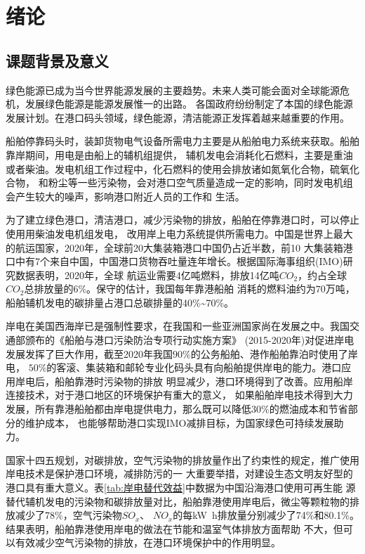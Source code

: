\chapter{绪论}

\section{课题背景及意义}
绿色能源已成为当今世界能源发展的主要趋势。未来人类可能会面对全球能源危机，发展绿色能源是能源发展惟一的出路。
各国政府纷纷制定了本国的绿色能源发展计划。在港口码头领域，绿色能源，清洁能源正发挥着越来越重要的作用。

船舶停靠码头时，装卸货物电气设备所需电力主要是从船舶电力系统来获取。船舶靠岸期间，用电是由船上的辅机组提供，
辅机发电会消耗化石燃料，主要是重油或者柴油。发电机组工作过程中，化石燃料的使用会排放诸如氮氧化合物，硫氧化合物，
和粉尘等一些污染物，会对港口空气质量造成一定的影响，同时发电机组会产生较大的噪声，影响港口附近人员的工作和
生活。

为了建立绿色港口，清洁港口，减少污染物的排放，船舶在停靠港口时，可以停止使用用柴油发电机组发电，
改用岸上电力系统提供所需电力。中国是世界上最大的航运国家，2020年，全球前20大集装箱港口中国仍占近半数，前10
大集装箱港口中有7个来自中国，中国港口货物吞吐量连年增长。根据国际海事组织(IMO)研究数据表明，2020年，全球
航运业需要4亿吨燃料，排放14亿吨$CO_{2}$，约占全球$CO_{2}$总排放量的$6\%$。保守的估计，我国每年靠港船舶
消耗的燃料油约为$70$万吨，船舶辅机发电的碳排量占港口总碳排量的40\%\~{}70\%\cite{SP1}。

岸电在美国西海岸已是强制性要求，在我国和一些亚洲国家尚在发展之中。我国交通部颁布的《船舶与港口污染防治专项行动实施方案》
(2015-2020年)对促进岸电发展发挥了巨大作用，截至2020年我国$90\%$的公务船舶、港作船舶靠泊时使用了岸电，
$50\%$的客滚、集装箱和邮轮专业化码头具有向船舶提供岸电的能力。港口应用岸电后，船舶靠港时污染物的排放
明显减少，港口环境得到了改善。应用船岸连接技术，对于港口地区的环境保护有重大的意义，
如果船舶岸电技术得到大力发展，所有靠港船舶都由岸电提供电力，那么既可以降低$30\%$的燃油成本\cite{SP2}和节省部分的维护成本，
也能够帮助港口实现IMO减排目标，为国家绿色可持续发展助力。

国家十四五规划，对碳排放，空气污染物的排放量作出了约束性的规定，推广使用岸电技术是保护港口环境，减排防污的一
大重要举措，对建设生态文明友好型的港口具有重大意义。表\ref{tab:岸电替代效益}中数据为中国沿海港口使用可再生能
源替代辅机发电的污染物和碳排放量对比，船舶靠港使用岸电后，微尘等颗粒物的排放减少了78\%，空气污染物$SO_{x}$、
$NO_{x}$的每\si{kW.h}排放量分别减少了74\%和80.1\%。结果表明，船舶靠港使用岸电的做法在节能和温室气体排放方面帮助
不大，但可以有效减少空气污染物的排放，在港口环境保护中的作用明显。

